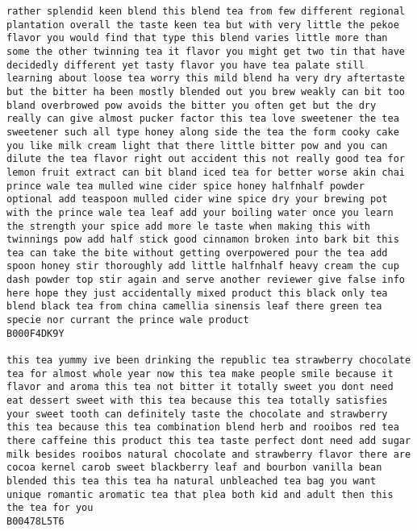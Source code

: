 \documentclass[11pt]{article}
\begin{document}
\begin{Verbatim}[commandchars=\\\{\}]
rather splendid keen blend this blend tea from few different regional plantation overall the taste keen tea but with very little the pekoe flavor you would find that type this blend varies little more than some the other twinning tea it flavor you might get two tin that have decidedly different yet tasty flavor you have tea palate still learning about loose tea worry this mild blend ha very dry aftertaste but the bitter ha been mostly blended out you brew weakly can bit too bland overbrowed pow avoids the bitter you often get but the dry really can give almost pucker factor this tea love sweetener the tea sweetener such all type honey along side the tea the form cooky cake you like milk cream light that there little bitter pow and you can dilute the tea flavor right out accident this not really good tea for lemon fruit extract can bit bland iced tea for better worse akin chai prince wale tea mulled wine cider spice honey halfnhalf powder optional add teaspoon mulled cider wine spice dry your brewing pot with the prince wale tea leaf add your boiling water once you learn the strength your spice add more le taste when making this with twinnings pow add half stick good cinnamon broken into bark bit this tea can take the bite without getting overpowered pour the tea add spoon honey stir thoroughly add little halfnhalf heavy cream the cup dash powder top stir again and serve another reviewer give false info here hope they just accidentally mixed product this black only tea blend black tea from china camellia sinensis leaf there green tea specie nor currant the prince wale product
B000F4DK9Y

this tea yummy ive been drinking the republic tea strawberry chocolate tea for almost whole year now this tea make people smile because it flavor and aroma this tea not bitter it totally sweet you dont need eat dessert sweet with this tea because this tea totally satisfies your sweet tooth can definitely taste the chocolate and strawberry this tea because this tea combination blend herb and rooibos red tea there caffeine this product this tea taste perfect dont need add sugar milk besides rooibos natural chocolate and strawberry flavor there are cocoa kernel carob sweet blackberry leaf and bourbon vanilla bean blended this tea this tea ha natural unbleached tea bag you want unique romantic aromatic tea that plea both kid and adult then this the tea for you
B00478L5T6


\end{Verbatim}
\end{document}
